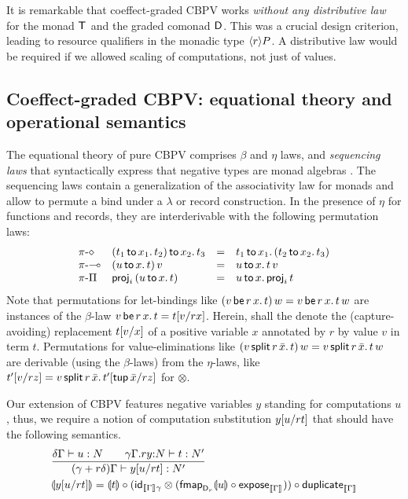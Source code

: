 \documentclass[acmsmall,review,anonymous]{acmart}\settopmatter{printfolios=true,printccs=false,printacmref=false}
\begin{document}
It is remarkable that coeffect-graded CBPV works \emph{without any
  distributive law} \cite{orchard:icfp16}
for the monad $\T$ and the graded comonad $\D$.
%
This was a crucial design criterion, leading to resource qualifiers in
the monadic type $\compty r P$.
%
A distributive law would be required if we allowed scaling of
computations, not just of values.


\subsection{Coeffect-graded CBPV: equational theory and operational semantics}

The equational theory of pure CBPV comprises $\beta$ and $\eta$ laws,
and \emph{sequencing laws} that syntactically express that negative
types are monad algebras \citep[Fig.~11]{levi:hosc06}.  The sequencing
laws contain a generalization of the associativity law for monads and
allow to permute a bind under a $\lambda$ or record construction.  In
the presence of $\eta$ for functions and records, they are
interderivable with the following permutation laws:
\[
\begin{array}{llcl}
\rpi\diamond
  & \bind {x_2} {(\bind {x_1} {t_1} {t_2})} {t_3}
  & = & \bind {x_1} {t_1} {(\bind {x_2} {t_2} {t_3})}
\\
\rpi\lolli
  & \app {(\bind x u t)} v
  & = & \bind x u {\app t v}
\\
\rpi\Pi
  & \proj i {(\bind x  u t)}
  & = & \bind x u {\proj i t}
\end{array}
\]
Note that permutations for let-bindings like
$\app{(\qlet r x v t)}w = \qlet r x v {\app t w}$ are instances of the
$\beta$-law $\qlet r x v t = \qsubst v r x t$.
%
Herein,  shall the denote the
(capture-avoiding) replacement $\subst v x t$ of a positive variable
$x$ annotated by $r$ by value $v$ in term $t$.
%
Permutations for value-eliminations like
$\app {(\qsplits r v {\bar x} t)} w = \qsplits r v {\bar x} {\app t
  w}$
are derivable (using the $\beta$-laws) from the $\eta$-laws, like
$\qsubst{v}{r}{z}{t'} = \qsplits r {v} {\bar x} {\qsubst {\ptup {\bar
      x}} r z {t'}}$ for $\otimes$.

Our extension of CBPV features negative variables $y$ standing for
computations $u$, thus, we require a notion of computation
substitution $\qsubst u r t y$ that should have the following semantics.
\begin{align*}
&
  \ru{\qCompTy \delta \Gamma u N \qquad
      \oCompTy {\qext \gamma \Gamma r y N} t {N'}
    }{\pCompTy {\gamma + r\delta} \Gamma {\qsubst u r t y} {N'}}
\\ &
  \dent{\qsubst u r t y} = \dent t
    \comp (\tid[\den\Gamma \gamma]
             \otimes (\fmapt[{\D[r]}] \dent u \comp \expose[\den\Gamma]))
    \comp \duplicate[\den\Gamma]
\end{align*}
\end{document}
